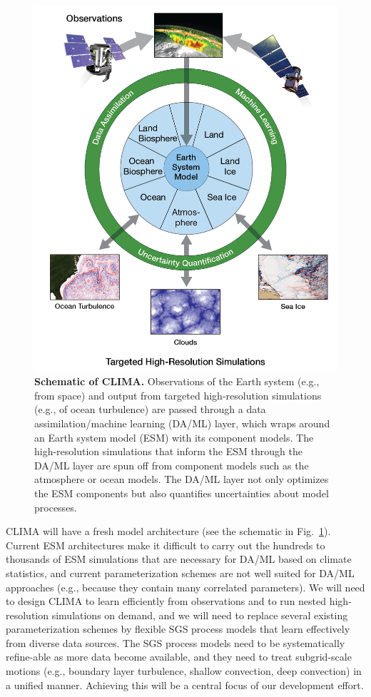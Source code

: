\documentclass{article}
\begin{document}
\begin{figure}
\centerline{\includegraphics[width=.95\textwidth]{CLIMA-schematic.png}}
\caption{\textbf{Schematic of CLIMA.} Observations of the Earth system (e.g., from space) and output from targeted high-resolution simulations (e.g., of ocean turbulence) are passed through a data assimilation/machine learning (DA/ML) layer, which wraps around an Earth system model (ESM) with its component models. The high-resolution simulations that inform the ESM through the DA/ML layer are spun off from component models such as the atmosphere or ocean models. The DA/ML layer not only optimizes the ESM components but also quantifies uncertainties about model processes.} 
\label{f:CLIMA-schematic}
\end{figure}
CLIMA will have a fresh model architecture (see the schematic in Fig.~\ref{f:CLIMA-schematic}). Current ESM architectures make it difficult to carry out the hundreds to thousands of ESM simulations that are necessary for DA/ML based on climate statistics, and current parameterization schemes are not well suited for DA/ML approaches (e.g., because they contain many correlated parameters).  We will need to design CLIMA to learn efficiently from observations and to run nested high-resolution simulations on demand, and we will need to replace several existing parameterization schemes by flexible SGS process models that learn effectively from diverse data sources. The SGS process models need to be systematically refine-able as more data become available, and they need to treat subgrid-scale motions (e.g., boundary layer turbulence, shallow convection, deep convection) in a unified manner. Achieving this will be a central focus of our development effort.
\end{document}
